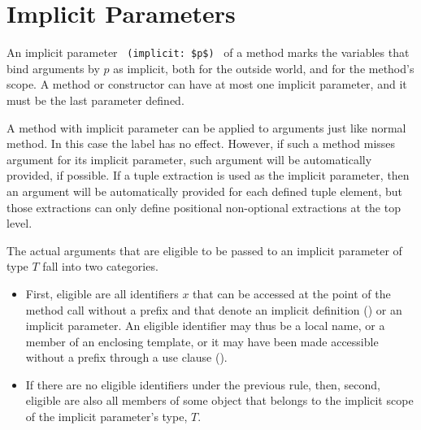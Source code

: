 \section{Implicit Parameters}
\label{sec:implicit-parameters}

An implicit parameter ~\lstinline!(implicit: $p$)!~ of a method marks the variables that bind arguments by $p$ as implicit, both for the outside world, and for the method's scope. A method or constructor can have at most one implicit parameter, and it must be the last parameter defined. 

A method with implicit parameter can be applied to arguments just like normal method. In this case the  label has no effect. However, if such a method misses argument for its implicit parameter, such argument will be automatically provided, if possible. If a tuple extraction is used as the implicit parameter, then an argument will be automatically provided for each defined tuple element, but those extractions can only define positional non-optional extractions at the top level. 

The actual arguments that are eligible to be passed to an implicit parameter of type $T$ fall into two categories.
\begin{itemize}
  \item First, eligible are all identifiers $x$ that can be accessed at the point of the method call without a prefix and that denote an implicit definition () or an implicit parameter. An eligible identifier may thus be a local name, or a member of an enclosing template, or it may have been made accessible without a prefix through a use clause (). 
  \item If there are no eligible identifiers under the previous rule, then, second, eligible are also all  members of some object that belongs to the implicit scope of the implicit parameter's type, $T$. 
\end{itemize}

